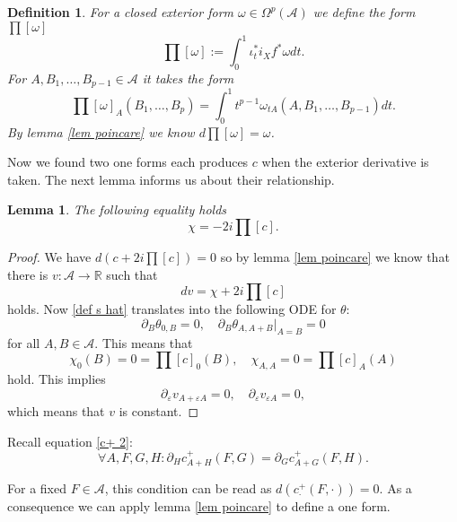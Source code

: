\documentclass[a4paper,11pt]{article}
\newtheorem{de}{Definition}
\newtheorem{lem}{Lemma}
\begin{document}
\begin{de}
For a closed exterior form \(\omega\in\Omega^{p}(\mathcal{A})\) we define the form \(\prod\![\omega]\)
\begin{equation}
\prod\![\omega]:=\int_{0}^1 \iota^*_t i_X f^* \omega dt.
\end{equation}
For \(A,B_1,\dots , B_{p-1}\in\mathcal{A}\) it takes the form 
\begin{equation}
\prod\![\omega]_A(B_1,\dots, B_p)=\int_0^1 t^{p-1} \omega_{tA}(A,B_1,\dots, B_{p-1})dt.
\end{equation}
By lemma \ref{lem poincare} we know \(d\prod\![\omega]=\omega\).
\end{de}

Now we found two one forms each produces \(c\) when the exterior derivative is taken. The next lemma informs us about their relationship.

\begin{lem}
The following equality holds
\begin{equation}
\chi=-2i \prod\![c].
\end{equation}
\end{lem}
\begin{proof}
We have \(d(c+2i \prod\![c])=0\) so by lemma \ref{lem poincare} we know that there is \(v:\mathcal{A}\rightarrow \mathbb{R}\) such that
\begin{equation}
dv=\chi+2i \prod\![c]
\end{equation}
holds. Now \eqref{def s hat} translates into the following ODE for \(\theta\):
\begin{equation}
\partial_B \theta_{0,B}=0, \quad \partial_B \theta_{A,A+B}|_{A=B}=0
\end{equation}
for all \(A,B\in\mathcal{A}\). This means that
\begin{equation}
\chi_0(B)=0=\prod\![c]_0(B), \quad \chi_{A,A}=0=\prod\![c]_A(A)
\end{equation}
hold. This implies
\begin{equation}
\partial_\varepsilon v_{A+\varepsilon A}=0, \quad \partial_\varepsilon v_{\varepsilon A}=0,
\end{equation}
which means that \(v\) is constant.
\end{proof}

Recall equation \eqref{c+ 2}: 
\begin{equation}
\forall A,F,G,H: \partial_H c_{A+H}^+(F,G)=\partial_G c^+_{A+G}(F,H).
\end{equation}

For a fixed \(F\in\mathcal{A}\), this condition can be read as \(d( c^+_{\cdot} (F,\cdot))=0\). As a consequence we can apply lemma \ref{lem poincare} to define a one form.
\end{document}
